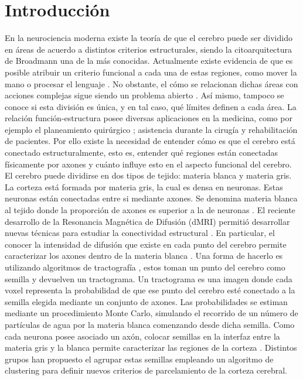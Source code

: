 \chapter{Introducci\'on}

En la neurociencia moderna existe la teor\'ia de que el cerebro
puede ser dividido en \'areas de acuerdo a distintos criterios estructurales,
siendo la citoarquitectura de Broadmann \cite{Brodmann1909} una de la m\'as conocidas.
Actualmente existe evidencia de que es posible atribuir un criterio funcional
a cada una de estas regiones, como mover la mano o procesar el lenguaje
\cite{Greicius2003}. No obstante, el c\'omo se relacionan dichas \'areas con acciones
complejas sigue siendo un problema abierto \cite{Barch2013}. As\'i mismo, tampoco
se conoce si esta divisi\'on es \'unica, y en tal caso, qu\'e l\'imites definen
a cada \'area. La relaci\'on funci\'on-estructura posee diversas aplicaciones en la
medicina, como por ejemplo el planeamiento quir\'urgico \cite{Stufflebeam2011}
\cite{Oishi2010}; asistencia durante la cirug\'ia \cite{Bello2008} y rehabilitaci\'on
\cite{Song2014} de pacientes. Por ello existe la necesidad de entender c\'omo es
que el cerebro est\'a conectado estructuralmente, esto es, entender qu\'e regiones
est\'an conectadas f\'isicamente por axones y cu\'anto influye esto en el aspecto
funcional del cerebro. \\

El cerebro puede dividirse en dos tipos de tejido: materia blanca y materia gris.
La corteza est\'a formada por materia gris, la cual es densa en neuronas. Estas 
neuronas est\'an conectadas entre si mediante axones. Se denomina materia blanca
al tejido donde la proporci\'on de axones es superior a la de neuronas \cite{Dale2008}.
El reciente desarrollo de la Resonancia Magn\'etica de Difusi\'on (dMRI) permiti\'o
desarrollar nuevas t\'ecnicas para estudiar la conectividad estructural \cite{Taylor1985}. 
En particular, el conocer la intensidad de difusi\'on que existe en cada punto del 
cerebro permite caracterizar los axones dentro de la materia blanca \cite{Hagmann2006}.
Una forma de hacerlo es utilizando algoritmos de tractograf\'ia \cite{Descoteaux2009}
\cite{Jbabdi2007}, estos toman un punto del cerebro como semilla y devuelven un
tractograma. Un tractograma es una imagen donde cada voxel representa la
probabilidad de que ese punto del cerebro est\'e conectado a la semilla elegida
mediante un conjunto de axones. Las probabilidades se estiman mediante un 
procedimiento Monte Carlo, simulando el recorrido de un n\'umero de part\'iculas
de agua por la materia blanca comenzando desde dicha semilla. Como cada neurona
posee asociado un ax\'on, colocar semillas en la interfaz entre la materia gris
y la blanca permite caracterizar las regiones de la corteza \cite{Mori2002}
\cite{Anwander2006}. Distintos grupos han propuesto el agrupar estas semillas
empleando un algoritmo de clustering para definir nuevos criterios de parcelamiento
de la corteza cerebral. \\


